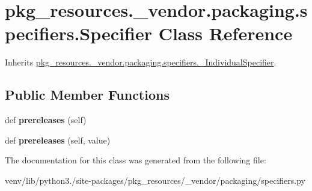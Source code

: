 \hypertarget{classpkg__resources_1_1__vendor_1_1packaging_1_1specifiers_1_1_specifier}{}\section{pkg\+\_\+resources.\+\_\+vendor.\+packaging.\+specifiers.\+Specifier Class Reference}
\label{classpkg__resources_1_1__vendor_1_1packaging_1_1specifiers_1_1_specifier}


Inherits \hyperlink{classpkg__resources_1_1__vendor_1_1packaging_1_1specifiers_1_1___individual_specifier}{pkg\+\_\+resources.\+\_\+vendor.\+packaging.\+specifiers.\+\_\+\+Individual\+Specifier}.

\subsection*{Public Member Functions}
\begin{DoxyCompactItemize}
\item 
\mbox{\label{classpkg__resources_1_1__vendor_1_1packaging_1_1specifiers_1_1_specifier_abb830c166bbec21e1ec2e4c57f74a68a}} 
def {\bfseries prereleases} (self)
\item 
\mbox{\label{classpkg__resources_1_1__vendor_1_1packaging_1_1specifiers_1_1_specifier_a29812ecb424a2dbbaddc7fcd95771f82}} 
def {\bfseries prereleases} (self, value)
\end{DoxyCompactItemize}


The documentation for this class was generated from the following file\+:\begin{DoxyCompactItemize}
\item 
venv/lib/python3./site-\/packages/pkg\+\_\+resources/\+\_\+vendor/packaging/specifiers.\+py\end{DoxyCompactItemize}
